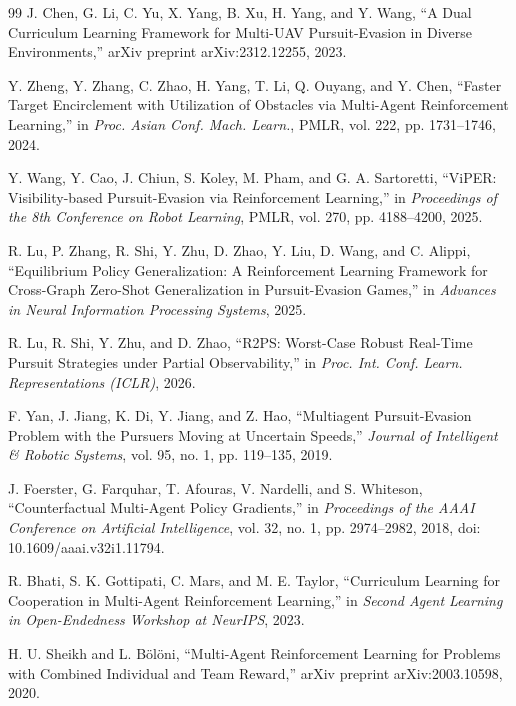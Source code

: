 \documentclass[journal]{IEEEtran}
\begin{document}
\begin{thebibliography}{99}
J. Chen, G. Li, C. Yu, X. Yang, B. Xu, H. Yang, and Y. Wang,
``A Dual Curriculum Learning Framework for Multi-UAV Pursuit-Evasion in Diverse Environments,''
arXiv preprint arXiv:2312.12255, 2023.

Y. Zheng, Y. Zhang, C. Zhao, H. Yang, T. Li, Q. Ouyang, and Y. Chen,
``Faster Target Encirclement with Utilization of Obstacles via Multi-Agent Reinforcement Learning,''
in \textit{Proc. Asian Conf. Mach. Learn.}, PMLR, vol. 222, pp. 1731--1746, 2024.

Y. Wang, Y. Cao, J. Chiun, S. Koley, M. Pham, and G. A. Sartoretti,
``ViPER: Visibility-based Pursuit-Evasion via Reinforcement Learning,''
in \textit{Proceedings of the 8th Conference on Robot Learning}, PMLR, vol. 270, pp. 4188--4200, 2025.

R. Lu, P. Zhang, R. Shi, Y. Zhu, D. Zhao, Y. Liu, D. Wang, and C. Alippi,
``Equilibrium Policy Generalization: A Reinforcement Learning Framework for Cross-Graph Zero-Shot Generalization in Pursuit-Evasion Games,''
in \textit{Advances in Neural Information Processing Systems}, 2025.

R. Lu, R. Shi, Y. Zhu, and D. Zhao,
``R2PS: Worst-Case Robust Real-Time Pursuit Strategies under Partial Observability,''
in \textit{Proc. Int. Conf. Learn. Representations (ICLR)}, 2026.

F. Yan, J. Jiang, K. Di, Y. Jiang, and Z. Hao,
``Multiagent Pursuit-Evasion Problem with the Pursuers Moving at Uncertain Speeds,''
\textit{Journal of Intelligent \& Robotic Systems}, vol. 95, no. 1, pp. 119--135, 2019.

J. Foerster, G. Farquhar, T. Afouras, V. Nardelli, and S. Whiteson,
``Counterfactual Multi-Agent Policy Gradients,''
in \textit{Proceedings of the AAAI Conference on Artificial Intelligence},
vol. 32, no. 1, pp. 2974--2982, 2018, doi: 10.1609/aaai.v32i1.11794.

R. Bhati, S. K. Gottipati, C. Mars, and M. E. Taylor,
``Curriculum Learning for Cooperation in Multi-Agent Reinforcement Learning,''
in \textit{Second Agent Learning in Open-Endedness Workshop at NeurIPS}, 2023.

H. U. Sheikh and L. B\"ol\"oni,
``Multi-Agent Reinforcement Learning for Problems with Combined Individual and Team Reward,''
arXiv preprint arXiv:2003.10598, 2020.


\end{thebibliography}
\end{document}
